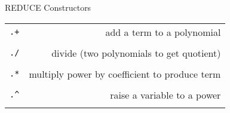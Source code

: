 \begin{center}
{\large REDUCE Constructors}
\end{center}
\begin{center}
\begin{tabular}{l r}
{\tt .+} & \parbox[t]{\redboxwidth}{add a term to a polynomial} \\ \\

{\tt ./} & \parbox[t]{\redboxwidth}{divide (two polynomials to get quotient)}
\\ \\
{\tt  .*} & \parbox[t]{\redboxwidth}{multiply power by coefficient to produce
                term} \\ \\

{\tt .\^{ }} & \parbox[t]{\redboxwidth}{raise a variable to a power} \\ \\
\end{tabular}
\end{center}

